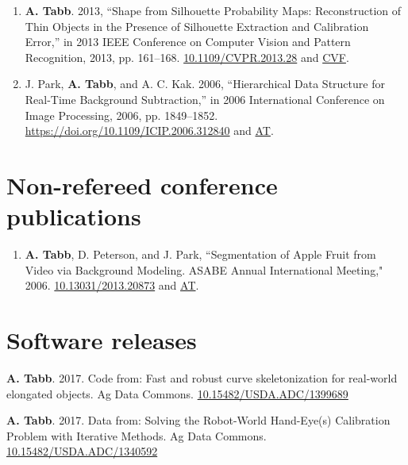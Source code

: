 \documentclass[letterpaper,11pt]{article}
\begin{document}
\begin{enumerate}[noitemsep, leftmargin=*,resume*]
\item{\textbf{A. Tabb}. 2013, ``Shape from Silhouette Probability Maps: Reconstruction of Thin Objects in the Presence of Silhouette Extraction and Calibration Error,” in 2013 IEEE Conference on Computer Vision and Pattern Recognition, 2013, pp. 161–168.   \href{https://doi.org/10.1109/CVPR.2013.28}{10.1109/CVPR.2013.28} and \href{https://www.cv-foundation.org/openaccess/content_cvpr_2013/papers/Tabb_Shape_from_Silhouette_2013_CVPR_paper.pdf}{CVF}.}

\item{J. Park, \textbf{A. Tabb}, and A. C. Kak. 2006, ``Hierarchical Data Structure for Real-Time Background Subtraction,” in 2006 International Conference on Image Processing, 2006, pp. 1849–1852. \url{https://doi.org/10.1109/ICIP.2006.312840} and \href{https://amytabb.com/pubs/Park_06_hierarchical_data_structure_for_real-time_background_subtraction.pdf}{AT}.}

\end{enumerate}

\section{Non-refereed conference publications}
\begin{enumerate}[noitemsep, leftmargin=*,label={}]
\item{\textbf{A. Tabb}, D. Peterson, and J. Park, ``Segmentation of Apple Fruit from Video via Background Modeling. ASABE Annual International Meeting," 2006.  \href{https://elibrary.asabe.org/abstract.asp?aid=20873}{10.13031/2013.20873} and \href{https://amytabb.com/pubs/Tabb_06_segmentation_of_apple_fruit_from_video_via_background_modeling.pdf}{AT}.}
\end{enumerate}

\section{Software releases}
\begin{enumerate}[noitemsep, leftmargin=*,label={[S\arabic*]}]
\item{\textbf{A. Tabb}. 2017. Code from: Fast and robust curve skeletonization for real-world elongated objects. Ag Data Commons.  \href{http://dx.doi.org/10.15482/USDA.ADC/1399689}{10.15482/USDA.ADC/1399689}}

\item{\textbf{A. Tabb}. 2017. Data from: Solving the Robot-World Hand-Eye(s) Calibration Problem with Iterative Methods. Ag Data Commons. \href{http://dx.doi.org/10.15482/USDA.ADC/1340592}{10.15482/USDA.ADC/1340592}}
\end{enumerate}
\end{document}
